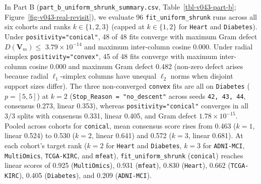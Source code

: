\documentclass[
  10pt,
  letterpaper,
]{report}
\begin{document}
In Part B (\texttt{part\_b\_uniform\_shrunk\_summary.csv},
Table~\ref{tbl-v043-part-b}; Figure~\ref{fig-v043-real-revisit}), we
evaluate 96 \texttt{fit\_uniform\_shrunk} runs across all six cohorts
and ranks \(k \in \{1, 2, 3\}\) (capped at \(k \in \{1, 2\}\) for
\texttt{Heart} and \texttt{Diabetes}). Under
\texttt{positivity="conical"}, 48 of 48 fits converge with maximum Gram
defect \(D(\mathbf{V}_m) \le\) \(3.79 \times 10^{-14}\) and maximum
inter-column cosine 0.000. Under radial simplex
\texttt{positivity="convex"}, 45 of 48 fits converge with maximum
inter-column cosine 0.000 and maximum Gram defect 0.482 (non-zero defect
arises because radial \(\ell_1\)-simplex columns have unequal \(\ell_2\)
norms when disjoint support sizes differ). The three non-converged
\texttt{convex} fits are all on \texttt{Diabetes} (\(p = [5, 5]\)) at
\(k = 2\) (\texttt{Stop\_Reason\ =\ "no\_descent"} across seeds
\texttt{42,\ 43,\ 44}, consensus 0.273, linear 0.353), whereas
\texttt{positivity="conical"} converges in all \(3/3\) splits with
consensus 0.331, linear 0.405, and Gram defect \(1.78 \times 10^{-15}\).
Pooled across cohorts for \texttt{conical}, mean consensus score rises
from 0.463 (\(k = 1\), linear 0.524) to 0.530 (\(k = 2\), linear 0.641)
and 0.572 (\(k = 3\), linear 0.681). At each cohort's target rank
(\(k = 2\) for \texttt{Heart} and \texttt{Diabetes}, \(k = 3\) for
\texttt{ADNI-MCI}, \texttt{MultiOmics}, \texttt{TCGA-KIRC}, and
\texttt{mfeat}), \texttt{fit\_uniform\_shrunk} (\texttt{conical})
reaches linear scores of 0.925 (\texttt{MultiOmics}), 0.931
(\texttt{mfeat}), 0.830 (\texttt{Heart}), 0.662 (\texttt{TCGA-KIRC}),
0.405 (\texttt{Diabetes}), and 0.209 (\texttt{ADNI-MCI}).
\end{document}
